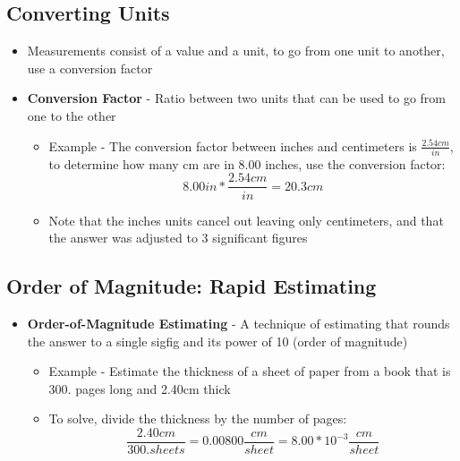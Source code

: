 \subsection{Converting Units}
    \begin{itemize}
        \item Measurements consist of a value and a unit, to go from one unit to another, use a conversion factor
        \item \textbf{Conversion Factor} - Ratio between two units that can be used to go from one to the other
        \begin{itemize}
            \item Example - The conversion factor between inches and centimeters is \(\frac{2.54cm}{in}\), to determine how many cm are in 8.00 inches, use the conversion factor: \[8.00in*\frac{2.54cm}{in}=20.3cm\]
            \item Note that the inches units cancel out leaving only centimeters, and that the answer was adjusted to 3 significant figures
        \end{itemize}
    \end{itemize}
	
\subsection{Order of Magnitude: Rapid Estimating}
    \begin{itemize}
        \item \textbf{Order-of-Magnitude Estimating} - A technique of estimating that rounds the answer to a single sigfig and its power of 10 (order of magnitude)
        \begin{itemize}
            \item Example - Estimate the thickness of a sheet of paper from a book that is 300. pages long and 2.40cm thick
            \item To solve, divide the thickness by the number of pages: \[\frac{2.40cm}{300. sheets}=0.00800\frac{cm}{sheet}=8.00*10^{-3}\frac{cm}{sheet}\]
        \end{itemize}
    \end{itemize}
	
